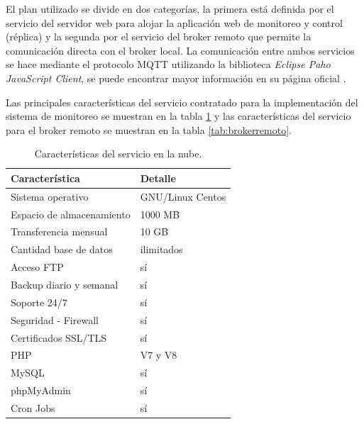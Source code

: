El plan utilizado se divide en dos categorías, la primera está definida por el servicio del servidor web para alojar la aplicación web de monitoreo y control (réplica) y la segunda por el servicio del broker remoto que permite la comunicación directa con el broker local. La comunicación entre ambos servicios se hace mediante el protocolo MQTT utilizando la biblioteca  \emph{Eclipse Paho JavaScript Client}, se puede encontrar mayor información en su página oficial \citep{WEBSITE:41}. 

Las principales características  del servicio contratado para la implementación del sistema de monitoreo se muestran en la tabla \ref{tab:serverweb} y las características del servicio para el broker remoto se muestran en la tabla  \ref{tab:brokerremoto}.


\begin{table}[h]
	\centering
	\caption[Características del servicio en la nube]{Características del servicio en la nube.}
	\begin{tabular}{p{7cm} p{5cm} }    
		\toprule
		\textbf{Característica} 	 & \textbf{Detalle}  \\
		\midrule
		Sistema operativo  & GNU/Linux Centos\\		
		Espacio de almacenamiento & 1000 MB \\
		Transferencia mensual  & 10 GB\\				
		Cantidad base de datos 	  & ilimitados\\
		Acceso FTP 	  & sí\\
		Backup diario y semanal 	  & sí\\
		Soporte 24/7 	  & sí\\
		Seguridad - Firewall	  & sí\\
		Certificados SSL/TLS	  & sí\\
		PHP	  & V7 y V8\\
		MySQL	  & sí\\
		phpMyAdmin	  & sí\\
		Cron Jobs	  & sí\\
		\bottomrule
		\hline
	\end{tabular}
	\label{tab:serverweb}
\end{table}


